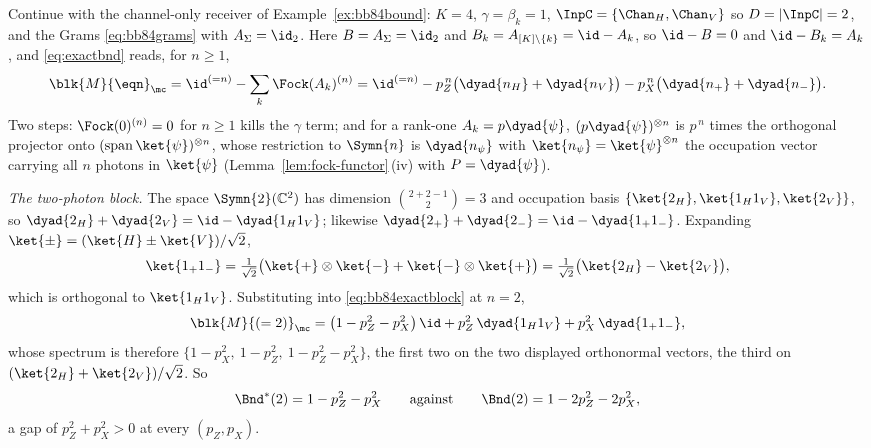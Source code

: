 \begin{example}\label{ex:bb84exact}
Continue with the channel-only receiver of Example~\ref{ex:bb84bound}: $K=4$,
$\gamma=\beta_k=1$, $\InpC=\{\Chan_H,\Chan_V\}$ so $D=|\InpC|=2$, and the Grams
\eqref{eq:bb84grams} with $A_\Sigma=\id_2$. Here $B=A_\Sigma=\id_2$ and
$B_k=A_{[K]\setminus\{k\}}=\id-A_k$, so $\id-B=0$ and $\id-B_k=A_k$, and
\eqref{eq:exactbnd} reads, for $n\ge1$,
\begin{equation}\label{eq:bb84exactblock}
  \blk{M}{\eqn}_{\mc}=\id^{(=n)}-\sum_{k}\Fock(A_k)^{(n)}
  =\id^{(=n)}-p_Z^{\,n}\big(\dyad{n_H}+\dyad{n_V}\big)
   -p_X^{\,n}\big(\dyad{n_+}+\dyad{n_-}\big).
\end{equation}
Two steps: $\Fock(0)^{(n)}=0$ for $n\ge1$ kills the $\gamma$ term; and for a
rank-one $A_k=p\dyad{\psi}$, $(p\dyad{\psi})^{\otimes n}$ is $p^{\,n}$ times
the orthogonal projector onto $(\operatorname{span}\ket{\psi})^{\otimes n}$,
whose restriction to $\Symn{n}$ is $\dyad{n_\psi}$ with
$\ket{n_\psi}=\ket{\psi}^{\otimes n}$ the occupation vector carrying all $n$
photons in $\ket{\psi}$ (Lemma~\ref{lem:fock-functor}\,(iv) with
$P=\dyad{\psi}$).

\emph{The two-photon block.} The space $\Symn{2}(\mathbb{C}^2)$ has
dimension $\binom{2+2-1}{2}=3$ and occupation basis
$\{\ket{2_H},\ket{1_H1_V},\ket{2_V}\}$, so
$\dyad{2_H}+\dyad{2_V}=\id-\dyad{1_H1_V}$; likewise
$\dyad{2_+}+\dyad{2_-}=\id-\dyad{1_+1_-}$. Expanding
$\ket{\pm}=(\ket{H}\pm\ket{V})/\sqrt2$,
\begin{equation}\label{eq:bb84exactvec}
  \ket{1_+1_-}=\tfrac{1}{\sqrt2}\big(\ket{+}\otimes\ket{-}
   +\ket{-}\otimes\ket{+}\big)
  =\tfrac{1}{\sqrt2}\big(\ket{2_H}-\ket{2_V}\big),
\end{equation}
which is orthogonal to $\ket{1_H1_V}$. Substituting into
\eqref{eq:bb84exactblock} at $n=2$,
\begin{equation}\label{eq:bb84exact2}
  \blk{M}{(=2)}_{\mc}=\big(1-p_Z^2-p_X^2\big)\,\id
   +p_Z^2\,\dyad{1_H1_V}+p_X^2\,\dyad{1_+1_-},
\end{equation}
whose spectrum is therefore $\{1-p_X^2,\ 1-p_Z^2,\ 1-p_Z^2-p_X^2\}$, the
first two on the two displayed orthonormal vectors, the third on
$(\ket{2_H}+\ket{2_V})/\sqrt2$. So
\begin{equation}\label{eq:bb84exactvalue}
  \Bnd^{\ast}(2)=1-p_Z^2-p_X^2
  \qquad\text{against}\qquad
  \Bnd(2)=1-2p_Z^2-2p_X^2 ,
\end{equation}
a gap of $p_Z^2+p_X^2>0$ at every $(p_Z,p_X)$.


\end{example}
